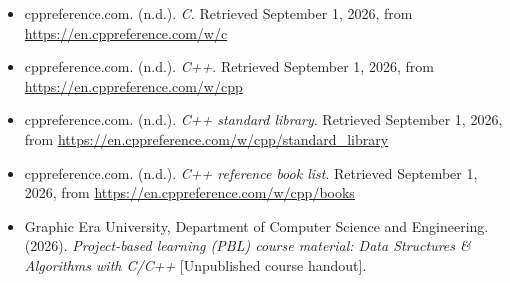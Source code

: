\documentclass[11pt,a4paper]{article}
\begin{document}
\begin{itemize}[leftmargin=1.5em]
  \item cppreference.com. (n.d.). \textit{C}. Retrieved September 1, 2026, from \url{https://en.cppreference.com/w/c}
  \item cppreference.com. (n.d.). \textit{C++}. Retrieved September 1, 2026, from \url{https://en.cppreference.com/w/cpp}
  \item cppreference.com. (n.d.). \textit{C++ standard library}. Retrieved September 1, 2026, from \url{https://en.cppreference.com/w/cpp/standard_library}
  \item cppreference.com. (n.d.). \textit{C++ reference book list}. Retrieved September 1, 2026, from \url{https://en.cppreference.com/w/cpp/books}
  \item Graphic Era University, Department of Computer Science and Engineering. (2026). \textit{Project-based learning (PBL) course material: Data Structures \& Algorithms with C/C++} [Unpublished course handout].
\end{itemize}
\end{document}
